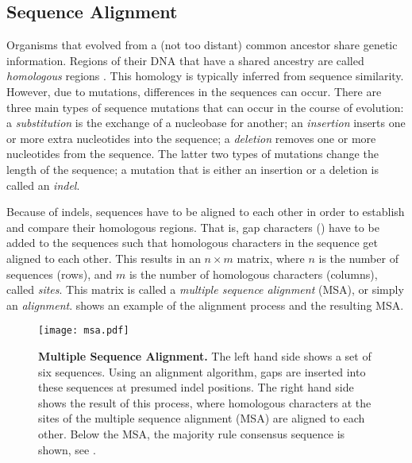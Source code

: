 


\subsection{Sequence Alignment}
\label{ch:Foundations:sec:SequenceAnalysis:sub:SequenceAlignment}

Organisms that evolved from a (not too distant) common ancestor share genetic information.
Regions of their \ac{DNA} that have a shared ancestry are called \emph{homologous} regions \cite{Koonin2005}.
This homology is typically inferred from sequence similarity. %
However, due to mutations, differences in the sequences can occur.
There are three main types of sequence mutations that can occur in the course of evolution:
a \emph{substitution} is the exchange of a nucleobase for another;
an \emph{insertion} inserts one or more extra nucleotides into the sequence;
a \emph{deletion} removes one or more nucleotides from the sequence.
The latter two types of mutations change the length of the sequence;
a mutation that is either an insertion or a deletion is called an \emph{indel}.

Because of indels, sequences have to be aligned to each other in order to establish and compare their homologous regions.
That is, gap characters (\nucleobase{-}) have to be added to the sequences
such that homologous characters in the sequence get aligned to each other.
This results in an $n \times m$ matrix,
where $n$ is the number of sequences (rows),
and $m$ is the number of homologous characters (columns), called \emph{sites}.
This matrix is called a \emph{multiple sequence alignment} (MSA), or simply an \emph{alignment}.
 shows an example of the alignment process and the resulting MSA.

\begin{figure}[hpbt]
    \centering
    \texttt{[image: msa.pdf]}
    \caption[Multiple Sequence Alignment]{
        \textbf{Multiple Sequence Alignment.}
        The left hand side shows a set of six sequences.
        Using an alignment algorithm, gaps are inserted into these sequences at presumed indel positions.
        The right hand side shows the result of this process,
        where homologous characters at the sites of the multiple sequence alignment (MSA) are aligned to each other.
        Below the MSA, the majority rule consensus sequence is shown,
        see .
    }
    \label{fig:msa}
\end{figure}

